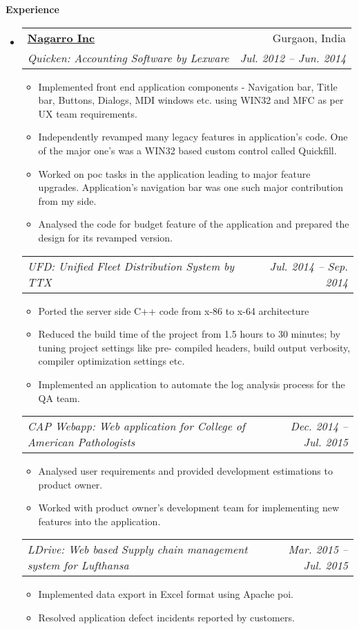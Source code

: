 \documentclass[letterpaper,11pt]{article}
\makeatletter
\newcommand{\resitem}[1]{\item #1 \vspace{-2pt}}
\newcommand{\resheading}[1]{{\large \colorbox{mygrey}{\begin{minipage}{\textwidth}{\textbf{#1 \vphantom{p\^{E}}}}\end{minipage}}}}
\newcommand{\ressubheading}[4]{
\begin{tabular*}{6.5in}{l@{\extracolsep{\fill}}r}
		\textbf{#1} & #2 \\
		\textit{#3} & \textit{#4} \\
\end{tabular*}\vspace{-6pt}}
\newcommand{\ressubsubheading}[2]{
\begin{tabular*}{6.5in}{l@{\extracolsep{\fill}}r}
		\textit{#1} & \textit{#2} \\
\end{tabular*}\vspace{-6pt}}
\makeatother
\begin{document}
\resheading{Experience}
	\begin{itemize}
		\item 
			\ressubheading{\href{http://www.nagarro.com/}{Nagarro Inc}}{Gurgaon, India}
				{Quicken: Accounting Software by Lexware}{Jul. 2012 -- Jun. 2014}
				{ \footnotesize
				\begin{itemize}
					\resitem{Implemented front end application components - Navigation bar, Title bar, Buttons, Dialogs, MDI windows etc. using WIN32 and MFC as per UX team requirements.}
					\resitem{Independently revamped many legacy features in application's code. One of the major one's was a WIN32 based custom control called Quickfill.}
					\resitem{Worked on poc tasks in the application leading to major feature upgrades. Application's navigation bar was one such major contribution from my side.}
					\resitem{Analysed the code for budget feature of the application and prepared the design for its revamped version.}
				\end{itemize}
				}

			\ressubsubheading{UFD: Unified Fleet Distribution System by TTX}{Jul. 2014 -- Sep. 2014}
				{ \footnotesize
				\begin{itemize}
					\resitem{Ported the server side C++ code from x-86 to x-64 architecture}
					\resitem{Reduced the build time of the project from 1.5 hours to 30 minutes; by tuning project settings like pre-
compiled headers, build output verbosity, compiler optimization settings etc.}
					\resitem{Implemented an application to automate the log analysis process for the QA team.}
				\end{itemize}
				}

			\ressubsubheading{CAP Webapp: Web application for College of American Pathologists}{Dec. 2014 -- Jul. 2015}
				{ \footnotesize
				\begin{itemize}
					\resitem{Analysed user requirements and provided development estimations to product owner.}
					\resitem{Worked with product owner's development team for implementing new features into the application.}
					\end{itemize}
				}			

			\ressubsubheading{LDrive: Web based Supply chain management system for Lufthansa}{Mar. 2015 -- Jul. 2015}
				{ \footnotesize
				\begin{itemize}
					\resitem{Implemented data export in Excel format using Apache poi.}
					\resitem{Resolved application defect incidents reported by customers.}
				\end{itemize}
				}
	\end{itemize}  %
\end{document}
